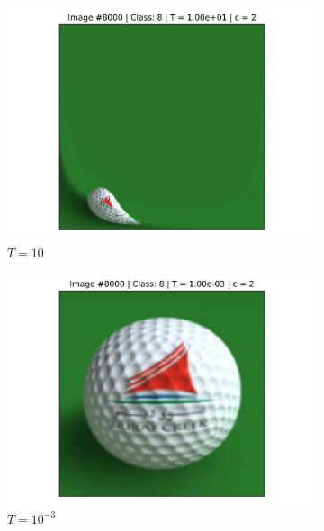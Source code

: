 \begin{figure}[!h]
\begin{subfigure}{0.18\textwidth}
    \includegraphics[width=\textwidth]{ch1-diffy/figures/warping_examples/8000_-1_0.png}
    \caption{$T=10$}
    \end{subfigure}
    \begin{subfigure}{0.18\textwidth}
    \includegraphics[width=\textwidth]{ch1-diffy/figures/warping_examples/8000_3_1.png}
    \caption{$T=10^{-3}$}
    \end{subfigure}
    \begin{subfigure}{0.18\textwidth}

\end{subfigure}
\end{figure}
